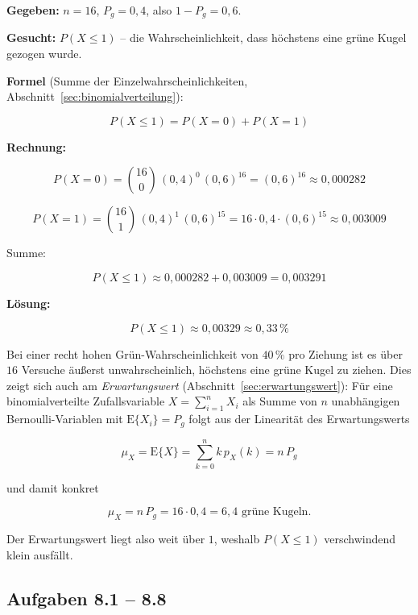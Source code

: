 \begin{beispiel}

\textbf{Gegeben:} $n = 16$, $P_g = 0{,}4$, also $1 - P_g = 0{,}6$.

\textbf{Gesucht:} $P(X \le 1)$ -- die Wahrscheinlichkeit, dass höchstens eine
grüne Kugel gezogen wurde.

\textbf{Formel} (Summe der Einzelwahrscheinlichkeiten,
Abschnitt~\ref{sec:binomialverteilung}):

$$
P(X \le 1) = P(X = 0) + P(X = 1)
$$

\textbf{Rechnung:}

$$
P(X = 0) = \binom{16}{0}\,(0{,}4)^{0}\,(0{,}6)^{16}
         = (0{,}6)^{16} \approx 0{,}000282
$$

$$
P(X = 1) = \binom{16}{1}\,(0{,}4)^{1}\,(0{,}6)^{15}
         = 16 \cdot 0{,}4 \cdot (0{,}6)^{15} \approx 0{,}003009
$$

Summe:

$$
P(X \le 1) \approx 0{,}000282 + 0{,}003009 = 0{,}003291
$$

\textbf{Lösung:}

$$
\boxed{P(X \le 1) \approx 0{,}00329 \approx 0{,}33\,\%}
$$

Bei einer recht hohen Grün-Wahrscheinlichkeit von $40\,\%$ pro Ziehung ist es
über $16$ Versuche äußerst unwahrscheinlich, höchstens eine grüne Kugel zu
ziehen. Dies zeigt sich auch am \emph{Erwartungswert}
(Abschnitt~\ref{sec:erwartungswert}): Für eine binomialverteilte Zufallsvariable
$X = \sum_{i=1}^{n} X_i$ als Summe von $n$ unabhängigen Bernoulli-Variablen mit
$\mathrm{E}\{X_i\} = P_g$ folgt aus der Linearität des Erwartungswerts

$$
\mu_X = \mathrm{E}\{X\} = \sum_{k=0}^{n} k\, p_X(k) = n\,P_g
$$

und damit konkret

$$
\mu_X = n\,P_g = 16 \cdot 0{,}4 = 6{,}4 \text{ grüne Kugeln}.
$$

Der Erwartungswert liegt also weit über $1$, weshalb $P(X \le 1)$ verschwindend
klein ausfällt.

\end{beispiel}

\subsection*{Aufgaben 8.1 – 8.8}

